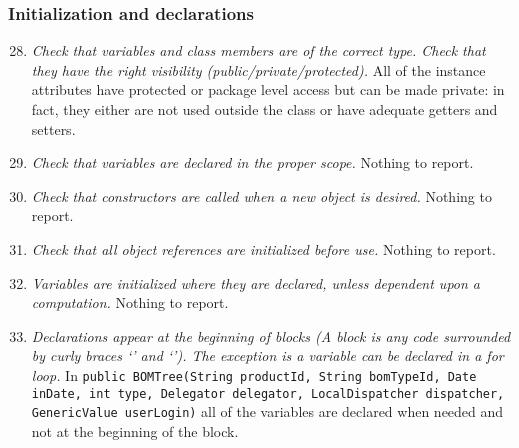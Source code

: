 	\subsubsection{Initialization and declarations}
		\begin{enumerate}
			\setcounter{enumi}{27}
			\item \textit{Check that variables and class members are of the correct type. Check that they have the right visibility (public/private/protected).}\newline
			All of the instance attributes have protected or package level access but can be made private: in fact, they either are not used outside the class or have adequate getters and setters.

			\item \textit{Check that variables are declared in the proper scope.}\newline
			Nothing to report. %

			\item \textit{Check that constructors are called when a new object is desired.}\newline
			Nothing to report. %

			\item \textit{Check that all object references are initialized before use.}\newline
			Nothing to report. %

			\item \textit{Variables are initialized where they are declared, unless dependent upon a computation.}\newline
			Nothing to report. %

			\item \textit{Declarations appear at the beginning of blocks (A block is any code surrounded by curly braces ‘{’ and ‘}’). The exception is a variable can be declared in a for loop.}\newline
			In \texttt{public BOMTree(String productId, String bomTypeId, Date inDate, int type, Delegator delegator, LocalDispatcher dispatcher, GenericValue userLogin)} all of the variables are declared when needed and not at the beginning of the block. %
		\end{enumerate}
